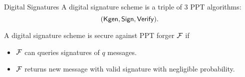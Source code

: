 \begin{frame}{Digital Signatures}
	A digital signature scheme is a triple of $3$ PPT algorithms:
	\begin{equation*}
		(\mathsf{Kgen}, \mathsf{Sign}, \mathsf{Verify}).
	\end{equation*}

	A digital signature scheme is secure against PPT forger $\mathcal{F}$ if
	\begin{itemize}
		\item $\mathcal{F}$ can queries signatures of $q$ messages.
		\item $\mathcal{F}$ returns new message with valid signature with negligible probability.
	\end{itemize}
\end{frame}